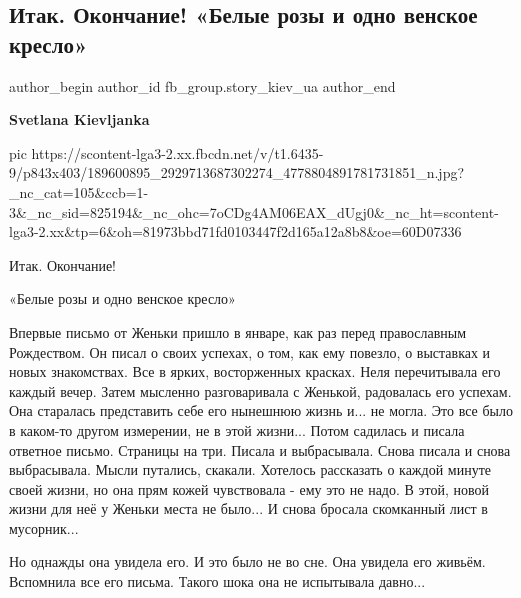  
 
 
 
 
 
\subsection{Итак. Окончание! «Белые розы и одно венское кресло»}
\label{sec:22_05_2021.fb.fb_group.story_kiev_ua.1.belye_rozy_okonchanie}
\ifcmt
 author_begin
   author_id fb_group.story_kiev_ua
 author_end
\fi

\textbf{Svetlana Kievljanka}


\ifcmt
  pic https://scontent-lga3-2.xx.fbcdn.net/v/t1.6435-9/p843x403/189600895_2929713687302274_4778804891781731851_n.jpg?_nc_cat=105&ccb=1-3&_nc_sid=825194&_nc_ohc=7oCDg4AM06EAX_dUgj0&_nc_ht=scontent-lga3-2.xx&tp=6&oh=81973bbd71fd0103447f2d165a12a8b8&oe=60D07336
\fi

Итак. Окончание! 

«Белые розы и одно венское кресло»

Впервые письмо от Женьки пришло в январе, как раз перед православным
Рождеством. Он писал о своих успехах, о том, как ему повезло, о выставках и новых
знакомствах. Все в ярких, восторженных красках. Неля перечитывала его каждый
вечер. Затем мысленно разговаривала с Женькой, радовалась его успехам. Она
старалась представить себе его нынешнюю жизнь и... не могла. Это все было в
каком-то другом измерении, не в этой жизни... Потом садилась и писала ответное
письмо. Страницы на три. Писала и выбрасывала. Снова писала и снова
выбрасывала. Мысли путались, скакали. Хотелось рассказать о каждой минуте своей
жизни, но она прям кожей чувствовала - ему это не надо. В этой, новой жизни для
неё у Женьки места не было... И снова бросала скомканный лист в мусорник...

Но однажды она увидела его. И это было не во сне. Она увидела его живьём.
Вспомнила все его письма. Такого шока она не испытывала давно...


